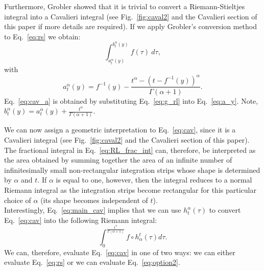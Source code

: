 \documentclass{article}
\theoremstyle{theorem}
\theoremstyle{definition}
\begin{document}
\noindent
Furthermore, Grobler showed that it is trivial to convert a Riemann-Stieltjes integral into a Cavalieri integral \cite{ackermann12,grobler19} (see Fig.~\ref{fig:caval2} and the Cavalieri section of this paper if more details are required). If we apply Grobler's conversion method to Eq.~\eqref{eq:rs} we obtain:
\begin{equation}
\label{eq:cav}
\int_{a_t^{\alpha}(y)}^{b_t^{\alpha}(y)} f(\tau)~d\tau, 
\end{equation}
with
\begin{equation}
\label{eq:cav_a}
a_t^{\alpha}(y) = f^{-1}(y) - \frac{t^{\alpha}-(t-f^{-1}(y))^{\alpha}}{\Gamma(\alpha+1)}.
\end{equation}
Eq.~\eqref{eq:cav_a} is obtained by substituting Eq.~\eqref{eq:g_rl} into Eq.~\eqref{eq:a_y}. Note, $b_t^{\alpha}(y) = a_t^{\alpha}(y) + \frac{t^{\alpha}}{\Gamma(\alpha+1)}$. 

\noindent
We can now assign a geometric interpretation to Eq.~\eqref{eq:cav}, since it is a Cavalieri integral (see Fig.~\ref{fig:caval2} and the Cavalieri section of this paper). The fractional integral in Eq.~\eqref{eq:RL_frac_int} can, therefore, be interpreted as the area obtained 
by summing together the area of an infinite number of infinitesimally small non-rectangular integration strips whose shape is determined by $\alpha$ and $t$. If $\alpha$ is equal to one, however, then the integral reduces to a normal Riemann integral as the integration strips become rectangular for this particular choice of $\alpha$ (its shape becomes independent of $t$).\\

\noindent
Interestingly, Eq.~\eqref{eq:main_cav} implies that we can use $h_t^{\alpha}(\tau)$ to convert Eq.~\eqref{eq:cav} into the following Riemann integral:
\begin{equation}
\label{eq:option2}
\int_0^{\frac{t^{\alpha}}{\Gamma(\alpha+1)}} f\circ h_{\alpha}^t (\tau) d\tau.  
\end{equation}
We can, therefore, evaluate Eq.~\eqref{eq:cav} in one of two ways: we can either evaluate Eq.~\eqref{eq:rs} or we can evaluate Eq.~\eqref{eq:option2}.
\end{document}
